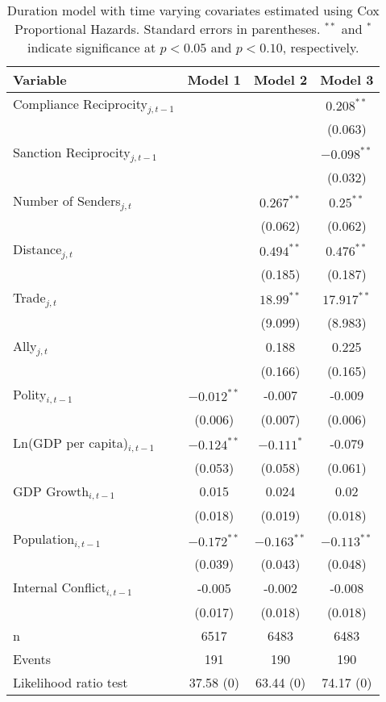 \begin{table}[ht]
\centering
{\normalsize
\begin{tabular}{lccc}
 Variable & Model 1 & Model 2 & Model 3 \\ 
  \hline
\hline
Compliance Reciprocity$_{j,t-1}$ &  &  & $0.208^{\ast\ast}$ \\ 
   &  &  & (0.063) \\ 
  Sanction Reciprocity$_{j,t-1}$ &  &  & $-0.098^{\ast\ast}$ \\ 
   &  &  & (0.032) \\ 
   \hline
Number of Senders$_{j,t}$ &  & $0.267^{\ast\ast}$ & $0.25^{\ast\ast}$ \\ 
   &  & (0.062) & (0.062) \\ 
  Distance$_{j,t}$ &  & $0.494^{\ast\ast}$ & $0.476^{\ast\ast}$ \\ 
   &  & (0.185) & (0.187) \\ 
  Trade$_{j,t}$ &  & $18.99^{\ast\ast}$ & $17.917^{\ast\ast}$ \\ 
   &  & (9.099) & (8.983) \\ 
  Ally$_{j,t}$ &  & 0.188 & 0.225 \\ 
   &  & (0.166) & (0.165) \\ 
   \hline
Polity$_{i,t-1}$ & $-0.012^{\ast\ast}$ & -0.007 & -0.009 \\ 
   & (0.006) & (0.007) & (0.006) \\ 
  Ln(GDP per capita)$_{i,t-1}$ & $-0.124^{\ast\ast}$ & $-0.111^{\ast}$ & -0.079 \\ 
   & (0.053) & (0.058) & (0.061) \\ 
  GDP Growth$_{i,t-1}$ & 0.015 & 0.024 & 0.02 \\ 
   & (0.018) & (0.019) & (0.018) \\ 
  Population$_{i,t-1}$ & $-0.172^{\ast\ast}$ & $-0.163^{\ast\ast}$ & $-0.113^{\ast\ast}$ \\ 
   & (0.039) & (0.043) & (0.048) \\ 
  Internal Conflict$_{i,t-1}$ & -0.005 & -0.002 & -0.008 \\ 
   & (0.017) & (0.018) & (0.018) \\ 
   \hline
n & 6517 & 6483 & 6483 \\ 
  Events & 191 & 190 & 190 \\ 
  Likelihood ratio test & 37.58 (0) & 63.44 (0) & 74.17 (0) \\ 
   \hline
\hline
\end{tabular}
}
\caption{Duration model with time varying covariates estimated using Cox Proportional Hazards. Standard errors in parentheses. $^{**}$ and $^{*}$ indicate significance at $p< 0.05 $ and $p< 0.10 $, respectively.} 
\label{tab:regResults}
\end{table}
